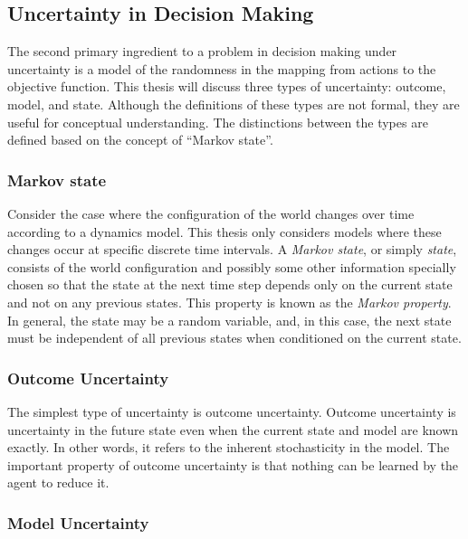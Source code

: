 \subsection{Uncertainty in Decision Making}


The second primary ingredient to a problem in decision making under uncertainty is a model of the randomness in the mapping from actions to the objective function.
This thesis will discuss three types of uncertainty: outcome, model, and state.
Although the definitions of these types are not formal, they are useful for conceptual understanding.
The distinctions between the types are defined based on the concept of ``Markov state''.

\subsubsection{Markov state}

Consider the case where the configuration of the world changes over time according to a dynamics model.
This thesis only considers models where these changes occur at specific discrete time intervals.
A \emph{Markov state}, or simply \emph{state}, consists of the world configuration and possibly some other information specially chosen so that the state at the next time step depends only on the current state and not on any previous states.
This property is known as the \emph{Markov property}.
In general, the state may be a random variable, and, in this case, the next state must be independent of all previous states when conditioned on the current state.

\subsubsection{Outcome Uncertainty}

The simplest type of uncertainty is outcome uncertainty.
Outcome uncertainty is uncertainty in the future state even when the current state and model are known exactly.
In other words, it refers to the inherent stochasticity in the model.
The important property of outcome uncertainty is that nothing can be learned by the agent to reduce it.

\subsubsection{Model Uncertainty}

